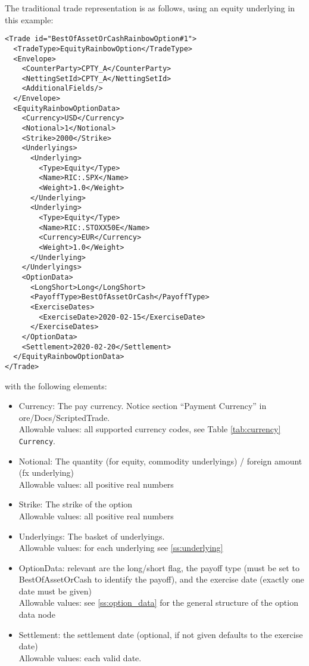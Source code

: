 The traditional trade representation is as follows, using an equity underlying in this example:

\begin{verbatim}
<Trade id="BestOfAssetOrCashRainbowOption#1">
  <TradeType>EquityRainbowOption</TradeType>
  <Envelope>
    <CounterParty>CPTY_A</CounterParty>
    <NettingSetId>CPTY_A</NettingSetId>
    <AdditionalFields/>
  </Envelope>
  <EquityRainbowOptionData>
    <Currency>USD</Currency>
    <Notional>1</Notional>
    <Strike>2000</Strike>
    <Underlyings>
      <Underlying>
        <Type>Equity</Type>
        <Name>RIC:.SPX</Name>
        <Weight>1.0</Weight>
      </Underlying>
      <Underlying>
        <Type>Equity</Type>
        <Name>RIC:.STOXX50E</Name>
        <Currency>EUR</Currency>
        <Weight>1.0</Weight>
      </Underlying>
    </Underlyings>
    <OptionData>
      <LongShort>Long</LongShort>
      <PayoffType>BestOfAssetOrCash</PayoffType>
      <ExerciseDates>
        <ExerciseDate>2020-02-15</ExerciseDate>
      </ExerciseDates>
    </OptionData>
    <Settlement>2020-02-20</Settlement>
  </EquityRainbowOptionData>
</Trade>
\end{verbatim}

with the following elements:

\begin{itemize}
\item Currency: The pay currency. Notice section ``Payment Currency'' in ore/Docs/ScriptedTrade. \\
  Allowable values: all supported currency codes, see Table \ref{tab:currency} \lstinline!Currency!.
\item Notional: The quantity (for equity, commodity underlyings) / foreign amount (fx underlying) \\
  Allowable values: all positive real numbers
\item Strike: The strike of the option \\
  Allowable values: all positive real numbers
\item Underlyings: The basket of underlyings. \\
  Allowable values: for each underlying see \ref{ss:underlying}
\item OptionData: relevant are the long/short flag, the payoff type (must be set to BestOfAssetOrCash to
  identify the payoff), and the exercise date (exactly one date must be given) \\
  Allowable values: see \ref{ss:option_data} for the general structure of the option data node
\item Settlement: the settlement date (optional, if not given defaults to the exercise date) \\
  Allowable values: each valid date.
\end{itemize}

